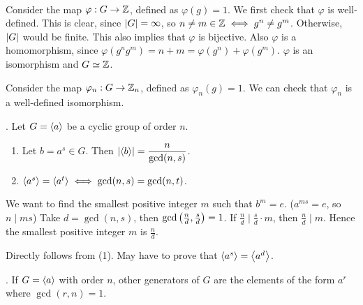 \pf \\
 Consider the map \(\varphi: G \rightarrow \mathbb{Z}\), defined as \(\varphi(g) = 1\). We first check that \(\varphi\) is well-defined. This is clear, since \(\left| G \right| = \infty\), so \(n \neq m \in \mathbb{Z} \iff g^n \neq g^m\). Otherwise, \(\left| G \right|\) would be finite. This also implies that \(\varphi\) is bijective. Also \(\varphi\) is a homomorphism, since \(\varphi(g^n g^m) = n + m = \varphi(g^n) + \varphi(g^m)\). \(\varphi\) is an isomorphism and \(G \simeq \mathbb{Z}\).

 Consider the map \(\varphi_n: G \rightarrow \mathbb{Z}_n\), defined as \(\varphi_n(g) = 1\). We can check that \(\varphi_n\) is a well-defined isomorphism.

\thm. Let \(G = \left\langle a \right\rangle\) be a cyclic group of order \(n\).
\begin{enumerate}
    \item Let \(b = a^s \in G\). Then \(\left| \left\langle b \right\rangle \right| = \dfrac{n}{\gcd(n, s)}\).
    \item \(\left\langle a^s \right\rangle = \left\langle a^t \right\rangle \iff \gcd(n, s) = \gcd(n, t)\).
\end{enumerate}

\pf
{} We want to find the smallest positive integer \(m\) such that \(b^m = e\). (\(a^{ms} = e\), so \(n \mid ms\)) Take \(d = \gcd(n, s)\), then \(\gcd\left( \frac{n}{d}, \frac{s}{d} \right) = 1\). If \(\frac{n}{d} \mid \frac{s}{d}\cdot m\), then \(\frac{n}{d} \mid m\). Hence the smallest positive integer \(m\) is \(\frac{n}{d}\).

 Directly follows from (1). May have to prove that \(\left\langle a^s \right\rangle = \left\langle a^d \right\rangle\).

\cor. If \(G = \left\langle a \right\rangle\) with order \(n\), other generators of \(G\) are the elements of the form \(a^r\) where \(\gcd(r, n) = 1\).

\pagebreak
